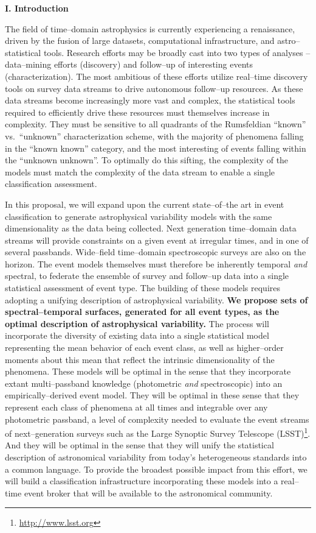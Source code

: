 \centerline{\bf I. Introduction} \smallskip

The field of time--domain astrophysics is currently experiencing a renaissance,
driven by the fusion of large datasets, computational infrastructure, and
astro--statistical tools.  Research efforts may be broadly cast into two types
of analyses -- data--mining efforts (discovery) and follow--up of interesting
events (characterization).  The most ambitious of these efforts utilize
real--time discovery tools on survey data streams to drive autonomous follow--up
resources. As these data streams become increasingly more vast and complex, the
statistical tools required to efficiently drive these resources must themselves
increase in complexity.  They must be sensitive to all quadrants of the
Rumsfeldian ``known'' vs.\ ``unknown'' characterization scheme, with the
majority of phenomena falling in the ``known known'' category, and the most
interesting of events falling within the ``unknown unknown''.  To optimally do
this sifting, the complexity of the models must match the complexity of the data
stream to enable a single classification assessment.

In this proposal, we will expand upon the current state--of--the art in event
classification to generate astrophysical variability models with the same
dimensionality as the data being collected. Next generation time--domain data
streams will provide constraints on a given event at irregular times, and in one
of several passbands.  Wide--field time--domain spectroscopic surveys are also
on the horizon.  The event models themselves must therefore be inherently
temporal {\it and} spectral, to federate the ensemble of survey and follow--up
data into a single statistical assessment of event type.  The building of these
models requires adopting a unifying description of astrophysical variability.
{\bf We propose sets of spectral--temporal surfaces, generated for all event
types, as the optimal description of astrophysical variability.}  The process
will incorporate the diversity of existing data into a single statistical model
representing the mean behavior of each event class, as well as higher--order
moments about this mean that reflect the intrinsic dimensionality of the
phenomena.  These models will be optimal in the sense that they incorporate
extant multi--passband knowledge (photometric {\it and} spectroscopic) into an
empirically--derived event model. They will be optimal in these sense that they
represent each class of phenomena at all times and integrable over any
photometric passband, a level of complexity needed to evaluate the event streams
of next--generation surveys such as the Large Synoptic Survey Telescope
(LSST)\footnote{\url{http://www.lsst.org}}. And they will be optimal in the
sense that they will unify the statistical description of astronomical
variability from today's heterogeneous standards into a common language.  To
provide the broadest possible impact from this effort, we will build a
classification infrastructure incorporating these models into a real--time event
broker that will be available to the astronomical community.


